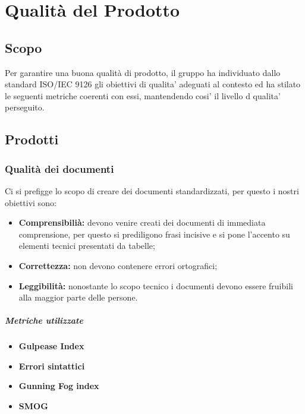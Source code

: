 \section{Qualità del Prodotto}
\subsection{Scopo}
Per garantire una buona qualità di prodotto, il gruppo ha individuato dallo standard ISO/IEC 9126 gli obiettivi di qualita' adeguati al contesto ed ha stilato le seguenti metriche coerenti con essi, mantendendo cosi' il livello d qualita' perseguito.

\subsection{Prodotti}
\subsubsection{Qualità dei documenti}
Ci si prefigge lo scopo di creare dei documenti standardizzati, per questo i nostri obiettivi sono:
\begin{itemize}
	\item{\textbf{Comprensibilià:} devono venire creati dei documenti di immediata comprensione, per questo si prediligono frasi incisive e si pone l'accento su elementi tecnici presentati da tabelle;}
	\item{\textbf{Correttezza:} non devono contenere errori ortografici;}
	\item{\textbf{Leggibilità:} nonostante lo scopo tecnico i documenti devono essere fruibili alla maggior parte delle persone.}
\end{itemize}
\vspace{0.8cm}
\subparagraph{Metriche utilizzate}
\begin{itemize}
	\item{\textbf{Gulpease Index}}
	\item{\textbf{Errori sintattici}}
	\item{\textbf{Gunning Fog index}}
	\item{\textbf{SMOG}}
\end{itemize}
\begin{table}[!htpb]
	\centering
	\renewcommand{\arraystretch}{2} 
	\caption{TBD}
\end{table}
